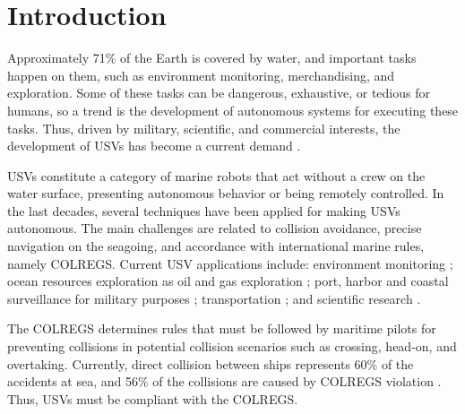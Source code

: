 \chapter{Introduction \label{chap:intro}}

    
    Approximately 71\% of the Earth is covered by water, and important tasks happen on them, such as environment monitoring, merchandising, and exploration. 
    Some of these tasks can be dangerous, exhaustive, or tedious for humans, so a trend is the development of autonomous systems for executing these tasks. Thus, driven by military, scientific, and commercial interests, the development of \acp{USV} has become a current demand \cite{Liu2016Unmanned}.
    
    \acp{USV} constitute a category of marine robots that act without a crew on the water surface, presenting autonomous behavior or being remotely controlled. In the last decades, several techniques have been applied for making \acp{USV} autonomous. The main challenges are related to collision avoidance, precise navigation on the seagoing, and accordance with international marine rules, namely \ac{COLREGS}.
    Current \ac{USV} applications include: environment monitoring \cite{Caccia2005Sampling}; ocean resources exploration as oil and gas exploration \cite{Pastore2010Improving}; port, harbor and coastal surveillance for military purposes \cite{Caccia2007unmanned, Pastore2010Improving, Svec2011aAutomated}; transportation \cite{Kiencke2005Impact}; and scientific research \cite{Yan2010Development}.
    
    The \acs{COLREGS} determines rules that must be followed by maritime pilots for preventing collisions in potential collision scenarios such as crossing, head-on, and overtaking. Currently, direct collision between ships represents 60\% of the accidents at sea, and 56\% of the collisions are caused by \acs{COLREGS} violation \cite{Liu2016Unmanned, Campbell2012Review_COLREGs}. Thus, \acp{USV} must be compliant with the \ac{COLREGS}.
    
